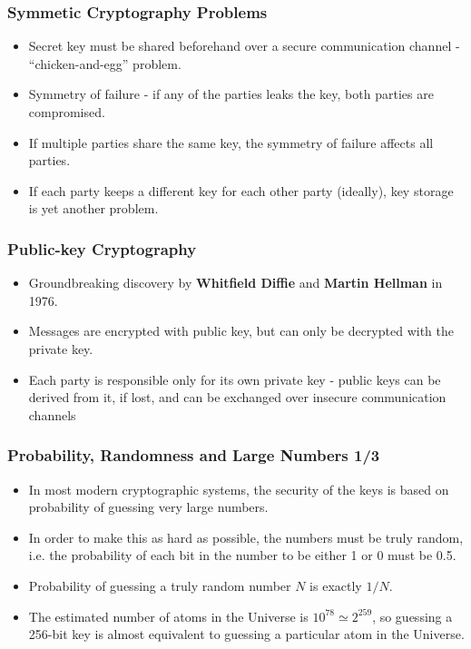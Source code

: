 \documentclass{beamer}
\begin{document}
\begin{frame}
  \frametitle{Symmetic Cryptography Problems}
  \begin{itemize}
  \item Secret key must be shared beforehand over a secure communication channel
    - ``chicken-and-egg'' problem.
  \item Symmetry of failure - if any of the parties leaks the key, both parties
    are compromised.    
  \item If multiple parties share the same key, the symmetry of failure affects
    all parties.  
  \item If each party keeps a different key for each other party (ideally), key
    storage is yet another problem.
  \end{itemize}
\end{frame}

\begin{frame}
  \frametitle{Public-key Cryptography}
  \begin{itemize}
  \item Groundbreaking discovery by \textbf{Whitfield Diffie} and \textbf{Martin
      Hellman} in 1976.
  \item Messages are encrypted with public key, but can only be decrypted with
    the private key.
  \item Each party is responsible only for its own private key - public keys can
    be derived from it, if lost, and can be exchanged over insecure
    communication channels
  \end{itemize}
\end{frame}

\begin{frame}[fragile]
  \frametitle{Probability, Randomness and Large Numbers 1/3}
  \begin{itemize}
  \item In most modern cryptographic systems, the security of the keys is based
    on probability of guessing very large numbers.
  \item In order to make this as hard as possible, the numbers must be truly
    random, i.e. the probability of each bit in the number to be either 1 or 0
    must be 0.5.
  \item Probability of guessing a truly random number $N$ is exactly $1/N$.
  \item The estimated number of atoms in the Universe is
    $10^{78} \simeq 2^{259}$, so guessing a 256-bit key is almost equivalent to
    guessing a particular atom in the Universe.
  \end{itemize}
\end{frame}
\end{document}
